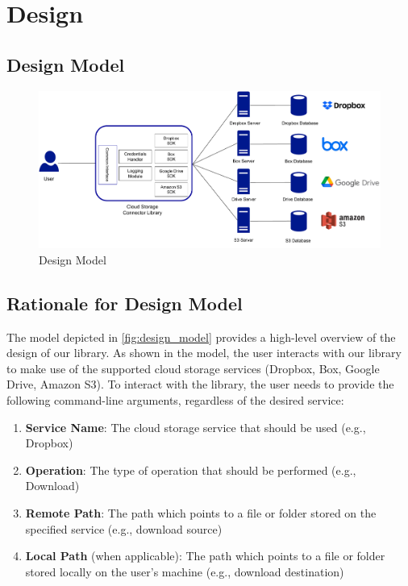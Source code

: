 \chapter{Design}\label{ch:design}

\section{Design Model}

\begin{figure} [h]
    \centering
    \includegraphics[scale=0.55]{images/design_diagram}
    \caption{\label{fig:design_model}Design Model}
\end{figure}

\section{Rationale for Design Model}
The model depicted in \autoref{fig:design_model} provides a high-level overview of the design of our library. As shown in the model, the user interacts with our library to make use of the supported cloud storage services (Dropbox, Box, Google Drive, Amazon S3). To interact with the library, the user needs to provide the following command-line arguments, regardless of the desired service:

\begin{enumerate}
    \item \textbf{Service Name}: The cloud storage service that should be used (e.g., Dropbox)

    \item \textbf{Operation}: The type of operation that should be performed (e.g., Download)

    \item \textbf{Remote Path}: The path which points to a file or folder stored on the specified service (e.g., download source)

    \item \textbf{Local Path} (when applicable): The path which points to a file or folder stored locally on the user's machine (e.g., download destination)
\end{enumerate}

